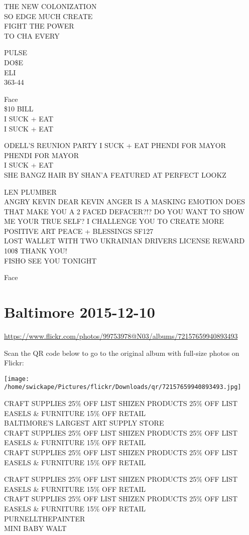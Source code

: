 \documentclass[10pt,letterpaper]{article}
\begin{document}
THE NEW COLONIZATION\\
SO EDGE MUCH CREATE\\
FIGHT THE POWER\\
TO CHA EVERY

PULSE\\
DO\$E\\
ELI\\
363{-}44

Face\\
\$10 BILL\\
I SUCK + EAT\\
I SUCK + EAT

ODELL'S REUNION PARTY I SUCK + EAT PHENDI FOR MAYOR\\
PHENDI FOR MAYOR\\
I SUCK + EAT\\
SHE BANGZ HAIR BY SHAN'A FEATURED AT PERFECT LOOKZ

LEN PLUMBER\\
ANGRY KEVIN DEAR KEVIN ANGER IS A MASKING EMOTION DOES THAT MAKE YOU A 2 FACED DEFACER?!?  DO YOU WANT TO SHOW ME YOUR TRUE SELF?  I CHALLENGE YOU TO CREATE MORE POSITIVE ART PEACE + BLESSINGS SF127\\
LOST WALLET WITH TWO UKRAINIAN DRIVERS LICENSE REWARD 100\$ THANK YOU!\\
FISHO SEE YOU TONIGHT

Face


\section*{Baltimore 2015-12-10}

\url{https://www.flickr.com/photos/99753978@N03/albums/72157659940893493}

Scan the QR code below to go to the original album with full-size photos on Flickr:

\texttt{[image: /home/swickape/Pictures/flickr/Downloads/qr/72157659940893493.jpg]}


CRAFT SUPPLIES 25\% OFF LIST SHIZEN PRODUCTS 25\% OFF LIST EASELS \& FURNITURE 15\% OFF RETAIL\\
BALTIMORE'S LARGEST ART SUPPLY STORE\\
CRAFT SUPPLIES 25\% OFF LIST SHIZEN PRODUCTS 25\% OFF LIST EASELS \& FURNITURE 15\% OFF RETAIL\\
CRAFT SUPPLIES 25\% OFF LIST SHIZEN PRODUCTS 25\% OFF LIST EASELS \& FURNITURE 15\% OFF RETAIL

CRAFT SUPPLIES 25\% OFF LIST SHIZEN PRODUCTS 25\% OFF LIST EASELS \& FURNITURE 15\% OFF RETAIL\\
CRAFT SUPPLIES 25\% OFF LIST SHIZEN PRODUCTS 25\% OFF LIST EASELS \& FURNITURE 15\% OFF RETAIL\\
PURNELLTHEPAINTER\\
MINI BABY WALT
\end{document}
